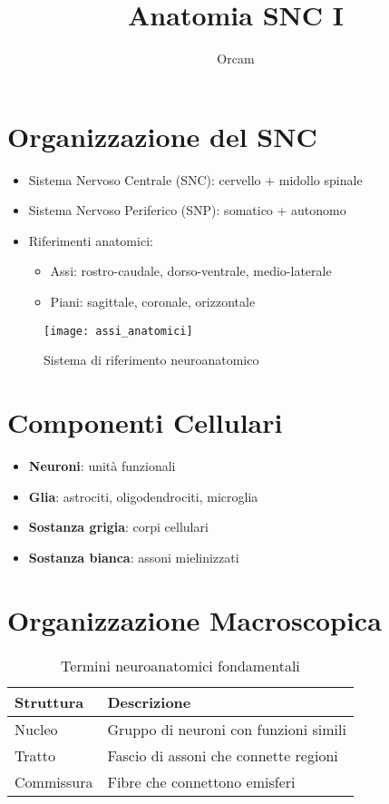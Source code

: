 \documentclass[12pt]{article}
\title{Anatomia SNC I}
\author{Orcam}
\date{}
\begin{document}
\maketitle

\section{Organizzazione del SNC}
\begin{itemize}
    \item Sistema Nervoso Centrale (SNC): cervello + midollo spinale
    \item Sistema Nervoso Periferico (SNP): somatico + autonomo
    \item Riferimenti anatomici:
    \begin{itemize}
        \item Assi: rostro-caudale, dorso-ventrale, medio-laterale
        \item Piani: sagittale, coronale, orizzontale
    \end{itemize}
\end{itemize}

\begin{figure}[h]
    \centering
    \texttt{[image: assi\_anatomici]}
    \caption{Sistema di riferimento neuroanatomico}
\end{figure}

\section{Componenti Cellulari}
\begin{itemize}
    \item \textbf{Neuroni}: unità funzionali
    \item \textbf{Glia}: astrociti, oligodendrociti, microglia
    \item \textbf{Sostanza grigia}: corpi cellulari
    \item \textbf{Sostanza bianca}: assoni mielinizzati
\end{itemize}

\section{Organizzazione Macroscopica}
\begin{table}[h]
    \centering
    \begin{tabular}{lp{10cm}}
        \toprule
        \textbf{Struttura} & \textbf{Descrizione} \\
        \midrule
        Nucleo & Gruppo di neuroni con funzioni simili \\
        Tratto & Fascio di assoni che connette regioni \\
        Commissura & Fibre che connettono emisferi \\
        \bottomrule
    \end{tabular}
    \caption{Termini neuroanatomici fondamentali}
\end{table}
\end{document}

